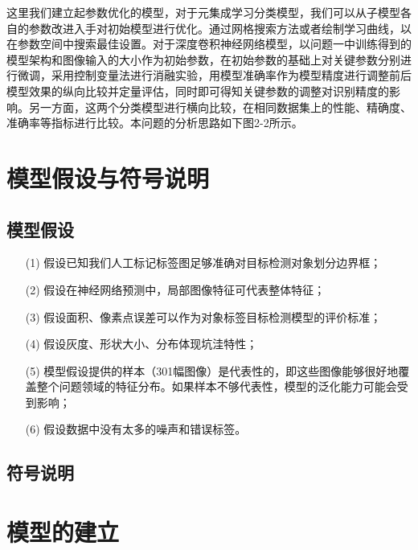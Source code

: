 \documentclass[a4paper, 10pt]{article}
\begin{document}
	这里我们建立起参数优化的模型，对于元集成学习分类模型，我们可以从子模型各自的参数改进入手对初始模型进行优化。通过网格搜索方法或者绘制学习曲线，以在参数空间中搜索最佳设置。对于深度卷积神经网络模型，以问题一中训练得到的模型架构和图像输入的大小作为初始参数，在初始参数的基础上对关键参数分别进行微调，采用控制变量法进行消融实验，用模型准确率作为模型精度进行调整前后模型效果的纵向比较并定量评估，同时即可得知关键参数的调整对识别精度的影响。另一方面，这两个分类模型进行横向比较，在相同数据集上的性能、精确度、准确率等指标进行比较。本问题的分析思路如下图2-2所示。
	
	\section{模型假设与符号说明}
	
	\subsection{模型假设}
	
	\begin{itemize}
		\item [(1)]
		假设已知我们人工标记标签图足够准确对目标检测对象划分边界框；
		
		\item [(2)]
		假设在神经网络预测中，局部图像特征可代表整体特征；
		
		\item[(3)]
		假设面积、像素点误差可以作为对象标签目标检测模型的评价标准；
		
		\item[(4)]
		假设灰度、形状大小、分布体现坑洼特性；
		
		\item[(5)]
		模型假设提供的样本（301幅图像）是代表性的，即这些图像能够很好地覆盖整个问题领域的特征分布。如果样本不够代表性，模型的泛化能力可能会受到影响；
		
		\item[(6)]
		假设数据中没有太多的噪声和错误标签。
		
	\end{itemize}
	
	\subsection{符号说明}
	
	\section{模型的建立}
	
\end{document}

